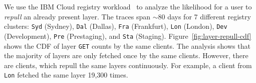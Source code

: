 We use the IBM Cloud registry workload~\cite{dockerworkload} to analyze the likelihood for
a user to \emph{repull} an already present layer.
%
The traces span $\sim$80 days for 7 different registry clusters:
\texttt{Syd} (Sydney), \texttt{Dal} (Dallas), \texttt{Fra} (Frankfurt), \texttt{Lon} (London),
\texttt{Dev} (Development), \texttt{Pre} (Prestaging), and \texttt{Sta} (Staging).
%
Figure~\ref{fig:layer-repull-cdf} shows the
CDF of layer \texttt{GET} counts by the same clients. 
%
The analysis shows that the majority of layers are only fetched once by the same clients.
%
However, there are clients, which repull the same layers continuously.  For
example, a client from \texttt{Lon} fetched the same layer 19,300 times.

